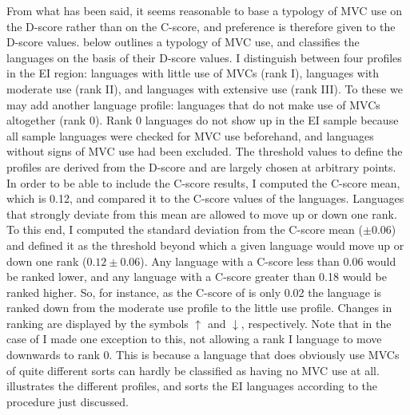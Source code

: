 From what has been said, it seems reasonable to base a typology of MVC use on the D-score rather than on the C-score, and preference is therefore given to the D-score values.  below outlines a typology of MVC use, and classifies the languages on the basis of their D-score values. I distinguish between four profiles in the EI region: languages with little use of MVCs (rank I), languages with moderate use (rank II), and languages with extensive use (rank III). To these we may add another language profile: languages that do not make use of MVCs altogether (rank 0). Rank 0 languages do not show up in the EI sample because all sample languages were checked for MVC use beforehand, and languages without signs of MVC use had been excluded. The threshold values to define the profiles are derived from the D-score and are largely chosen at arbitrary points. In order to be able to include the C-score results, I computed the C-score mean, which is 0.12, and compared it to the C-score values of the languages. Languages that strongly deviate from this mean are allowed to move up or down one rank. To this end, I computed the standard deviation from the C-score mean ($\pm 0.06$) and defined it as the threshold beyond which a given language would move up or down one rank ($0.12 \pm 0.06$). Any language with a C-score less than 0.06 would be ranked lower, and any language with a C-score greater than 0.18 would be ranked higher. So, for instance, as the C-score of  is only 0.02 the language is ranked down from the moderate use profile to the little use profile. Changes in ranking are displayed by the symbols $\uparrow$ and $\downarrow$, respectively. Note that in the case of  I made one exception to this, not allowing a rank I language to move downwards to rank 0. This is because a language that does obviously use MVCs of quite different sorts can hardly be classified as having no MVC use at all.  illustrates the different profiles, and sorts the EI languages according to the procedure just discussed.

